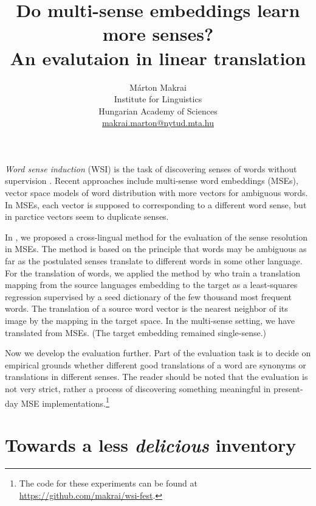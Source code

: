 \documentclass[11pt]{article}
\title{Do multi-sense embeddings learn more senses? \\ An evalutaion in linear
translation}
\author{
  Márton Makrai
  \\ Institute for Linguistics\\
  Hungarian Academy of Sciences \\
  \href{mailto:makrai.hlt@gmail.com}{makrai.marton@nytud.mta.hu} \\
}
\date{}
\begin{document}
\maketitle




\emph{Word sense induction} (WSI) is the task of discovering senses of words
without supervision \citep{Schutze:1998}. Recent approaches include multi-sense
word embeddings (MSEs), vector space models of word distribution with more
vectors for ambiguous words. In MSEs, each vector is supposed to corresponding
to a different word sense, but in parctice vectors seem to duplicate senses.

In \cite{Borbely:2016}, we proposed a cross-lingual method for the evaluation
of the sense resolution in MSEs. The method is based on the principle that
words may be ambiguous as far as the postulated senses translate to different
words in some other language.  For the translation of words, we applied the
method by \citet{Mikolov:2013x} who train a translation mapping from the source
languages embedding to the target as a least-squares regression supervised by a
seed dictionary of the few thousand most frequent words. The translation of a
source word vector is the nearest neighbor of its image by the mapping in the
target space. In the multi-sense setting, we have translated from MSEs. (The
target embedding remained single-sense.)

Now we develop the evaluation further. Part of the evaluation task is to decide
on empirical grounds whether different good translations of a word are synonyms
or translations in different senses.  
The reader should
be noted that the evaluation is not very strict, rather a process of
discovering something meaningful in present-day MSE
implementations.\footnote{The code for these experiments can be found at
\url{https://github.com/makrai/wsi-fest}.}

\section{Towards a less \emph{delicious} inventory}
\end{document}
